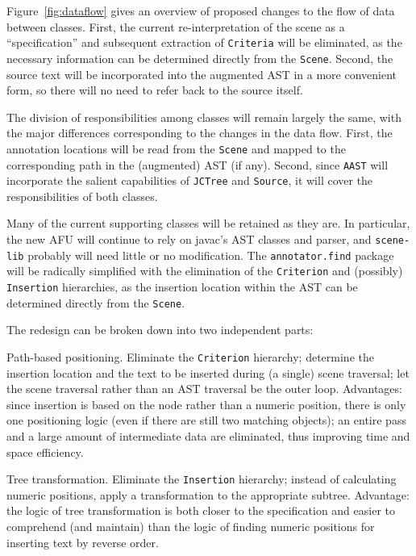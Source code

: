 \documentclass{article}
\begin{document}
Figure~\ref{fig:dataflow} gives an overview of proposed changes to the
flow of data between classes.  First, the current re-interpretation of
the scene as a ``specification'' and subsequent extraction of
\texttt{Criteria} will be eliminated, as the necessary information can
be determined directly from the \texttt{Scene}.  Second, the source text
will be incorporated into the augmented AST in a more convenient form,
so there will no need to refer back to the source itself.

The division of responsibilities among classes will remain largely the
same, with the major differences corresponding to the changes in the
data flow.  First, the annotation locations will be read from the
\texttt{Scene} and mapped to the corresponding path in the (augmented)
AST (if any).  Second, since \texttt{AAST} will incorporate the salient
capabilities of \texttt{JCTree} and \texttt{Source}, it will cover the
responsibilities of both classes.

Many of the current supporting classes will be retained as they are.  In
particular, the new AFU will continue to rely on javac's AST classes and
parser, and \texttt{scene-lib} probably will need little or no
modification.  The \texttt{annotator.find} package will be radically
simplified with the elimination of the \texttt{Criterion} and
(possibly) \texttt{Insertion} hierarchies, as the insertion location
within the AST can be determined directly from the \texttt{Scene}.

The redesign can be broken down into two independent parts:
\begin{description}
\item{Path-based positioning.} Eliminate the \texttt{Criterion}
hierarchy; determine the insertion location and the text to be inserted
during (a single) scene traversal; let the scene traversal rather than
an AST traversal be the outer loop.  Advantages: since insertion is
based on the node rather than a numeric position, there is only one
positioning logic (even if there are still two matching objects); an
entire pass and a large amount of intermediate data are eliminated, thus
improving time and space efficiency.
\item{Tree transformation.}  Eliminate the \texttt{Insertion} hierarchy;
instead of calculating numeric positions, apply a transformation to the
appropriate subtree.  Advantage: the logic of tree transformation is
both closer to the specification and easier to comprehend (and maintain)
than the logic of finding numeric positions for inserting text by
reverse order.
\end{description}
\end{document}
